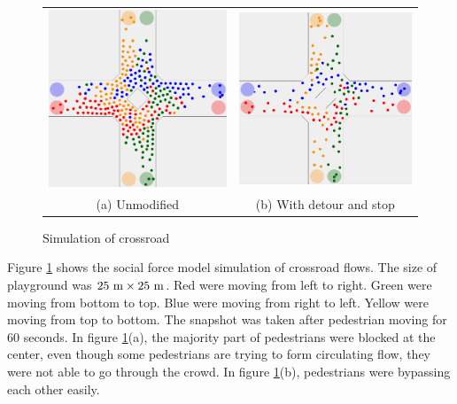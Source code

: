 \documentclass{article}
\begin{document}
            \begin{figure}[htb]
                \centering
                \begin{tabular}{cc}
                    \includegraphics[natwidth=960,natheight=958,width=6cm]{img/cross1.png} &
                    \includegraphics[natwidth=962,natheight=958,width=6cm]{img/cross2.png} \\
                    (a) Unmodified & (b) With detour and stop \\
                \end{tabular}
                \caption{Simulation of crossroad}
                \label{img_cross}
            \end{figure}

            Figure \ref{img_cross} shows the social force model simulation of crossroad flows. The size of playground was $25\rm{\ m}\times 25\rm{\ m}$.
            Red were moving from left to right. Green were moving from bottom to top.  Blue were moving from right to left.  Yellow were moving from top to bottom.
            The snapshot was taken after pedestrian moving for 60 seconds.
            In figure \ref{img_cross}(a), the majority part of pedestrians were blocked at the center, even though some pedestrians are trying to form circulating flow, they were not able to go through the crowd. In figure \ref{img_cross}(b), pedestrians were bypassing each other easily.
\end{document}
